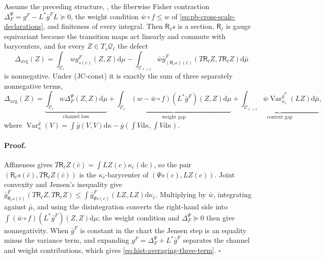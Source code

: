 Assume the preceding structure, , the fiberwise
Fisher contraction $\Delta_F^\Psi=g^F-L^*\bar g^FL\succeq0$, the weight
condition $\bar w\circ f\leq w$ of
\eqref{eq:pb-cross-scale-declarations}, and finiteness of every integral.  Then
$\mathsf R_\ell s$ is a section, $\mathsf R_\ell$ is gauge equivariant because
the transition maps act linearly and commute with barycenters, and for every
$Z\in T_s\mathcal Q_\ell$ the defect
\begin{equation}
\Delta_{\mathrm{avg}}(Z)
=\int_{\mathcal C_\ell}wg^F_{s(c)}(Z,Z)\mathrm d\mu
-\int_{\mathcal C_{\ell+1}}\bar w
\bar g^F_{(\mathsf R_\ell s)(\bar c)}
\left(T\mathsf R_\ell Z,T\mathsf R_\ell Z\right)\mathrm d\bar\mu
\label{eq:hist-averaging-defect}
\end{equation}
is nonnegative.  Under (JC-const) it is exactly the sum of three separately
nonnegative terms,
\begin{equation}
\Delta_{\mathrm{avg}}(Z)
=\underbrace{\int_{\mathcal C_\ell}w\Delta_F^\Psi(Z,Z)\mathrm d\mu}
_{\text{channel loss}}
+\underbrace{\int_{\mathcal C_\ell}(w-\bar w\circ f)
\left(L^*\bar g^F\right)(Z,Z)\mathrm d\mu}_{\text{weight gap}}
+\underbrace{\int_{\mathcal C_{\ell+1}}\bar w
\operatorname{Var}^{\bar g^F}_{\kappa_{\bar c}}(LZ)\mathrm d\bar\mu}
_{\text{context gap}},
\label{eq:hist-averaging-three-term}
\end{equation}
where
$\operatorname{Var}^{\bar g}_\kappa(V)
=\int\bar g(V,V)\mathrm d\kappa-\bar g(\int V\mathrm d\kappa,\int V\mathrm d\kappa)$.

\paragraph{Proof.}
Affineness gives
$T\mathsf R_\ell Z(\bar c)=\int LZ(c)\kappa_{\bar c}(\mathrm dc)$, so the pair
$(\mathsf R_\ell s(\bar c),T\mathsf R_\ell Z(\bar c))$ is the
$\kappa_{\bar c}$-barycenter of $(\Psi s(c),LZ(c))$.  Joint convexity and
Jensen's inequality give
$\bar g^F_{\mathsf R_\ell s(\bar c)}(T\mathsf R_\ell Z,T\mathsf R_\ell Z)
\leq\int\bar g^F_{\Psi s(c)}(LZ,LZ)\mathrm d\kappa_{\bar c}$.  Multiplying by
$\bar w$, integrating against $\bar\mu$, and using the disintegration converts
the right-hand side into $\int(\bar w\circ f)(L^*\bar g^F)(Z,Z)\mathrm d\mu$;
the weight condition and $\Delta_F^\Psi\succeq0$ then give nonnegativity.  When
$\bar g^F$ is constant in the chart the Jensen step is an equality minus the
variance term, and expanding $g^F=\Delta_F^\Psi+L^*\bar g^F$ separates the
channel and weight contributions, which gives
\eqref{eq:hist-averaging-three-term}.  $\square$

